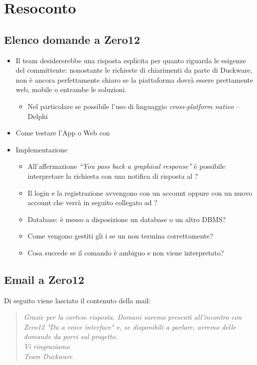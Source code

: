 \clearpage
\section{Resoconto}
	\subsection{Elenco domande a Zero12}
		\begin{itemize}
			\item Il team desidererebbe una risposta esplicita per quanto riguarda le esigenze del committente: nonostante le richieste di chiarimenti  da parte di Duckware, non è ancora perfettamente chiaro se la piattaforma dovrà  essere prettamente web, mobile o entrambe le soluzioni.
			\begin{itemize}
				\item Nel particolare se possibile l'uso di linguaggio \emph{cross-platform nativo} – Delphi
			\end{itemize}
			\item Come testare l’App o Web con 
			\item Implementazione
			\begin{itemize}
				\item All'affermazione \emph{“You pass back a graphical response”} è possibile interpretare la richiesta con una notifica di risposta al ?
				\item Il login e la registrazione avvengono con un account   oppure con un nuovo account che verrà in seguito collegato ad  ?
				\item Database: è messo a disposizione un database  o un altro DBMS?
				\item Come vengono gestiti gli i se un  non termina correttamente?
				\item Cosa succede se il comando è ambiguo e non viene interpretato?
			\end{itemize}
		\end{itemize}
	
	\subsection{Email a Zero12}
	Di seguito viene lasciato il contenuto della mail:
\begin{quote}
	\textit{
 	Grazie per la cortese risposta.
 	Domani saremo presenti all'incontro con Zero12 "Da  a voice interface" e, se disponibili a parlare, avremo delle domande da porvi sul progetto.\\[0.5cm]
 	Vi ringraziamo \\
 	Team Duckware
 	}
\end{quote}
\clearpage
